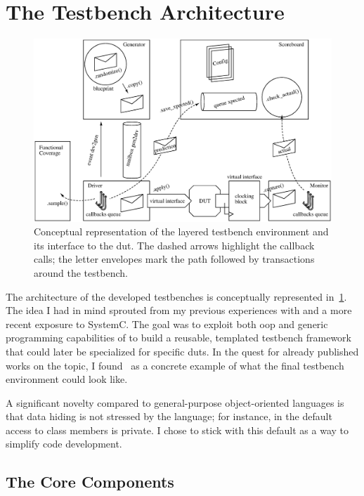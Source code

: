 \section{The Testbench Architecture}\label{sec:testbench-architecture}

\begin{figure}
    \centering
    \includegraphics[width=\textwidth]{fig/bench.eps}
    \caption{Conceptual representation of the layered testbench environment and its interface to the \ac{dut}. The dashed arrows highlight the callback calls; the letter envelopes mark the path followed by transactions around the testbench.}
    \label{fig:bench}
\end{figure}

The architecture of the developed testbenches is conceptually represented in~\cref{fig:bench}. The idea I had in mind sprouted from my previous experiences with \CC and a more recent exposure to SystemC. The goal was to exploit both \ac{oop} and generic programming capabilities of \sv to build a reusable, templated testbench framework that could later be specialized for specific \ac{dut}s. In the quest for already published works on the topic, I found~\cite{spear:svfe} as a concrete example of what the final testbench environment could look like. 

A significant novelty compared to general-purpose object-oriented languages is that data hiding is not stressed by the language; for instance, in \CC the default access to class members is private. I chose to stick with this default as a way to simplify code development.

\subsection{The Core Components}

